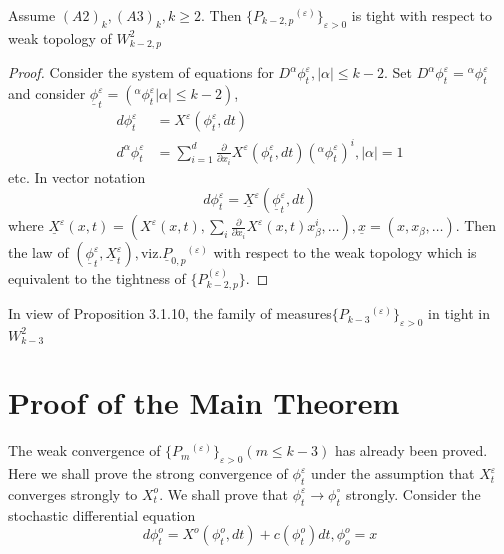 \setcounter{theorem}{3}
\begin{theorem}\label{c3:thm3.6.4} %
  Assume $(A2)_k, (A3)_k, k \ge 2$. Then $\{
  P_{k-2,p}{^{(\varepsilon)}}\}_{\varepsilon > 0}$ is tight with
  respect to weak topology of $W^2_{k-2,p}$ 
\end{theorem}

\begin{proof}
  Consider the system of equations for $D^\alpha \phi^\varepsilon_t, |
  \alpha | \le k - 2$. Set $D^\alpha \phi^\varepsilon_t = {}^\alpha
  \phi^\varepsilon_t$ and consider $\underline{\phi}^\varepsilon_t =
  ({}^\alpha \phi^\varepsilon_t |\alpha| \le k-2 )$, 
  \begin{align*}
    d \phi^\varepsilon_t & = X^\varepsilon (\phi^\varepsilon_t, dt)\\
    d^\alpha \phi^\varepsilon_t & = \sum^d_{i=1}
    \frac{\partial}{\partial x_i} X^\varepsilon (\phi^\varepsilon_t,
    dt ) ({}^\alpha \phi^\varepsilon_t)^i, |\alpha| = 1 
  \end{align*}
  etc. In vector notation
  $$
  d \phi^\varepsilon_t = \underline{X}^\varepsilon
  (\underline{\phi}^\varepsilon_t, dt) 
  $$
  where $\underline{X}^\varepsilon (x,t) = (X^\varepsilon (x,t),
  \sum\limits_i \frac{\partial}{\partial x_i} X^\varepsilon (x,t)
  x^i_\beta, \ldots), \underline{x} = (x,x_\beta, \ldots)$. Then the
  law of $(\underline{\phi}^\varepsilon_t,
  \underline{X}^\varepsilon_t),
  \text{viz}. \underline{P}_{0,p}{^{(\varepsilon)}}$ with respect to
  the weak topology which is equivalent to  the tightness of $\{
  P^{(\varepsilon)}_{k-2, p}\}$. 
\end{proof}

\setcounter{remark}{4}
\begin{remark}\label{c3:rem3.6.5} %
  In view of Proposition 3.1.10, the family of measures\-$\{
  P_{k-3}{^{(\varepsilon)}}\}_{\varepsilon >0}$ in tight in $W^2_{k-3}$ 
\end{remark}


\section{Proof of the Main Theorem}\label{chap3:sec3.7}
The weak convergence of $\{P_m{^{(\varepsilon)}}\}_{\varepsilon > 0}
(m \le k-3)$ has already been proved. Here we shall prove the strong
convergence of $\phi^\varepsilon_t$ under the assumption that
$X^\varepsilon_t$ converges strongly to $X^o_t$. We shall prove that
$\phi^\varepsilon_t \to \phi^\circ_t$ strongly. Consider the
stochastic differential equation  
\begin{equation*}
  d \phi^o_t = X^o (\phi^o_t,dt) +c(\phi^o_t)dt, 
\phi^o_o = x \tag{3.7.1}\label{c3:eq3.7.1}
\end{equation*}\pageoriginale

